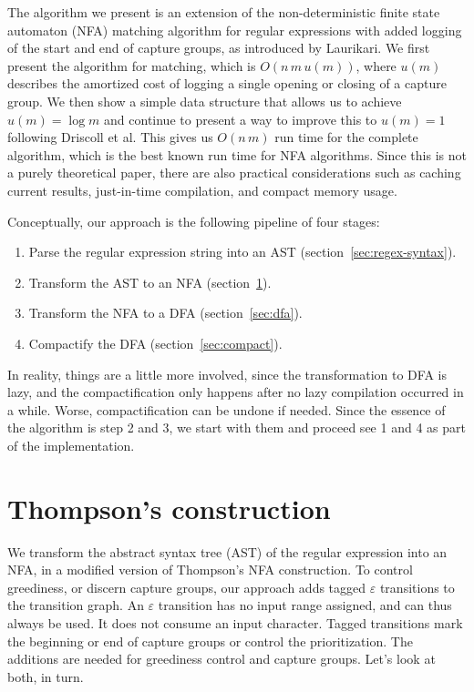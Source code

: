 \documentclass[11pt,a4paper,twoside,openright]{Thesis}
\theoremstyle{definition}
\newcommand{\Secref}[1]{section~\ref{sec:#1}}
\newcommand{\seclabel}[1]{\label{sec:#1}}
\begin{document}
The algorithm we present is an extension of the non-deterministic finite state
automaton (NFA) matching algorithm for regular expressions with added logging
of the start and end of capture groups, as introduced by
Laurikari\cite{Laur00a}. We first present the algorithm for matching,
which is $O(n\, m\, u(m))$, where $u(m)$ describes the amortized cost of
logging a single opening or closing of a capture group. We then show a
simple data structure that allows us to achieve $u(m) = \log m$ and
continue to present a way to improve this to $u(m) = 1$ following Driscoll et
al\cite{Dris89a}. This gives us $O(n\, m)$ run time for the
complete algorithm, which is the best known run time for NFA algorithms. Since
this is not a purely theoretical paper, there are also practical considerations
such as caching current results, just-in-time compilation, and compact memory
usage.

Conceptually, our approach is the following pipeline of four stages:
\begin{enumerate}
  \item Parse the regular expression string into an AST (\Secref{regex-syntax}).
  \item Transform the AST to an NFA (\Secref{thompson}).
  \item Transform the NFA to a DFA (\Secref{dfa}).
  \item Compactify the DFA (\Secref{compact}).
\end{enumerate}

In reality, things are a little more involved, since the transformation
to DFA is lazy, and the compactification only happens after no lazy
compilation occurred in a while. Worse, compactification can be
undone if needed. Since the essence of the algorithm is step 2 and 3,
we start with them and proceed see 1 and 4 as part of the implementation.

\section{Thompson's construction} 	\seclabel{thompson}

We transform the abstract syntax tree (AST) of the regular expression into an NFA,
in a modified version of Thompson's NFA construction. To
control greediness, or discern capture groups, our approach adds tagged
$\varepsilon$ transitions to the transition graph. An
$\varepsilon$ transition has no input range assigned, and can thus always
be used. It does not consume an input character. Tagged transitions
mark the beginning or end of capture groups or control the prioritization.
The additions are needed for greediness control and capture groups.
Let's look at both, in turn.
\end{document}
